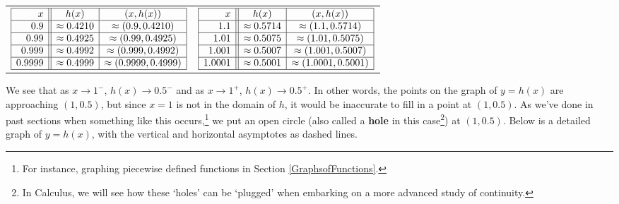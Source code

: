\begin{center}
\begin{tabular}{cc}

$\begin{array}{|r||c|c|}  \hline

  x & h(x) & (x,h(x)) \\ \hline
 0.9 & \approx 0.4210 & \approx (0.9, 0.4210) \\  \hline
 0.99 & \approx 0.4925 & \approx (0.99, 0.4925) \\  \hline
 0.999 & \approx 0.4992 & \approx (0.999, 0.4992) \\  \hline
  0.9999 & \approx 0.4999 & \approx (0.9999, 0.4999) \\  \hline
  \end{array} $ \hspace{.75in} & 

$\begin{array}{|r||c|c|}  \hline 
  x & h(x) & (x,h(x)) \\ \hline
  1.1 & \approx 0.5714 & \approx (1.1, 0.5714) \\  \hline
  1.01 & \approx  0.5075 & \approx (1.01, 0.5075) \\  \hline
  1.001 & \approx 0.5007 & \approx (1.001, 0.5007) \\  \hline
  1.0001 & \approx 0.5001 & \approx (1.0001, 0.5001) \\  \hline

\end{array}$  \\

\end{tabular}

\end{center}

We see that as $x \rightarrow 1^{-}$, $h(x) \rightarrow 0.5^{-}$ and as $x \rightarrow 1^{+}$, $h(x) \rightarrow 0.5^{+}$.  In other words, the points on the graph of $y=h(x)$ are approaching $(1,0.5)$, but since $x=1$ is not in the domain of $h$, it would be inaccurate to fill in a point at $(1,0.5)$.  As we've done in past sections when something like this occurs,\footnote{For instance, graphing piecewise defined functions in Section \ref{GraphsofFunctions}.} we put an open circle (also called a {\bf hole} in this case\footnote{In Calculus, we will see how these `holes' can be `plugged' when embarking on a more advanced study of continuity.}) at $(1,0.5)$.  Below is a detailed graph of $y=h(x)$, with the vertical and horizontal asymptotes as dashed lines.

